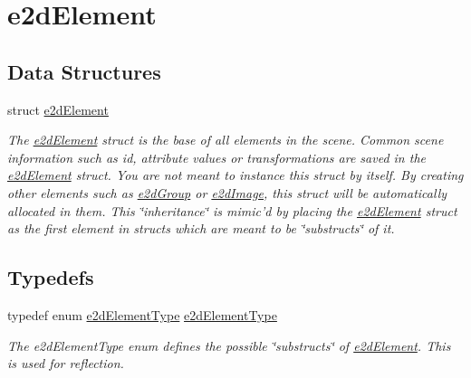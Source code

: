 \hypertarget{group__e2dElement}{\section{e2d\-Element}
\label{group__e2dElement}
}
\subsection*{Data Structures}
\begin{DoxyCompactItemize}
\item 
struct \hyperlink{structe2dElement}{e2d\-Element}
\begin{DoxyCompactList}\small\item\em The \hyperlink{structe2dElement}{e2d\-Element} struct is the base of all elements in the scene. Common scene information such as id, attribute values or transformations are saved in the \hyperlink{structe2dElement}{e2d\-Element} struct. You are not meant to instance this struct by itself. By creating other elements such as \hyperlink{structe2dGroup}{e2d\-Group} or \hyperlink{structe2dImage}{e2d\-Image}, this struct will be automatically allocated in them. This \char`\"{}inheritance\char`\"{} is mimic'd by placing the \hyperlink{structe2dElement}{e2d\-Element} struct as the first element in structs which are meant to be \char`\"{}substructs\char`\"{} of it. \end{DoxyCompactList}\end{DoxyCompactItemize}
\subsection*{Typedefs}
\begin{DoxyCompactItemize}
\item 
\hypertarget{group__e2dElement_ga13e962cd8fa5eaa7d4bec3fc7d774d59}{typedef enum \hyperlink{group__e2dElement_ga9bc8cfdec08c7e9069fc707ee456fd38}{e2d\-Element\-Type} \hyperlink{group__e2dElement_ga13e962cd8fa5eaa7d4bec3fc7d774d59}{e2d\-Element\-Type}}\label{group__e2dElement_ga13e962cd8fa5eaa7d4bec3fc7d774d59}

\begin{DoxyCompactList}\small\item\em The e2d\-Element\-Type enum defines the possible \char`\"{}substructs\char`\"{} of \hyperlink{structe2dElement}{e2d\-Element}. This is used for reflection. \end{DoxyCompactList}\end{DoxyCompactItemize}
